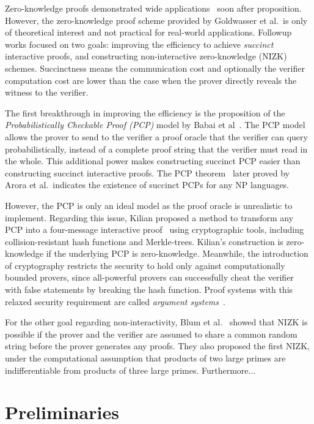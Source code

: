 \documentclass[acmtog]{acmart}
\begin{document}
Zero-knowledge proofs demonstrated wide applications~\cite{GoldreichMW86, GoldreichMW87} soon after proposition.
However, the zero-knowledge proof scheme provided by Goldwasser et al.\ is only of theoretical interest and not practical for real-world applications.
Followup works focused on two goals: improving the efficiency to achieve \emph{succinct} interactive proofs, and constructing non-interactive zero-knowledge (NIZK) schemes.
Succinctness means the communication cost and optionally the verifier computation cost are lower than the case when the prover directly reveals the witness to the verifier.

The first breakthrough in improving the efficiency is the proposition of the \emph{Probabilistically Checkable Proof (PCP)} model by Babai et al~\cite{BabaiFLS91}.
The PCP model allows the prover to send to the verifier a proof oracle that the verifier can query probabilistically, instead of a complete proof string that the verifier must read in the whole.
This additional power makes constructing succinct PCP easier than constructing succinct interactive proofs.
The PCP theorem~\cite{AroraLMSS98} later proved by Arora et al.\ indicates the existence of succinct PCPs for any NP languages.

However, the PCP is only an ideal model as the proof oracle is unrealistic to implement.
Regarding this issue, Kilian proposed a method to transform any PCP into a four-message interactive proof~\cite{Kilian92} using cryptographic tools, including collision-resistant hash functions and Merkle-trees.
Kilian's construction is zero-knowledge if the underlying PCP is zero-knowledge.
Meanwhile, the introduction of cryptography restricts the security to hold only against computationally bounded provers, since all-powerful provers can successfully cheat the verifier with false statements by breaking the hash function.
Proof systems with this relaxed security requirement are called \emph{argument systems}~\cite{BrassardCC88}.

For the other goal regarding non-interactivity, Blum et al.~\cite{BlumFM88} showed that NIZK is possible if the prover and the verifier are assumed to share a common random string before the prover generates any proofs.
They also proposed the first NIZK, under the computational assumption that products of two large primes are indifferentiable from products of three large primes.
Furthermore...

\section{Preliminaries}
\end{document}

